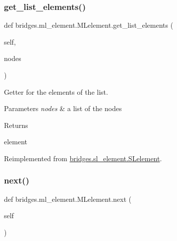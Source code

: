 \mbox{\label{classbridges_1_1ml__element_1_1_m_lelement_a3996cd2cec7c3978437392eba2ef66eb}} 
\subsubsection{\texorpdfstring{get\_list\_elements()}{get\_list\_elements()}}
{\footnotesize\ttfamily def bridges.\+ml\+\_\+element.\+M\+Lelement.\+get\+\_\+list\+\_\+elements (\begin{DoxyParamCaption}\item[{}]{self,  }\item[{}]{nodes }\end{DoxyParamCaption})}



Getter for the elements of the list. 


\begin{DoxyParams}{Parameters}
{\em nodes} & a list of the nodes \\
\hline
\end{DoxyParams}
\begin{DoxyReturn}{Returns}


element 
\end{DoxyReturn}


Reimplemented from \mbox{\hyperlink{classbridges_1_1sl__element_1_1_s_lelement_ad3b94c8e7540aca841e6306c190e1be1}{bridges.\+sl\+\_\+element.\+S\+Lelement}}.

\mbox{\label{classbridges_1_1ml__element_1_1_m_lelement_a951d30261514e6eaefdd7d60f1c77f73}} 
\subsubsection{\texorpdfstring{next()}{next()}\hspace{0.1cm}{\footnotesize\ttfamily [1/2]}}
{\footnotesize\ttfamily def bridges.\+ml\+\_\+element.\+M\+Lelement.\+next (\begin{DoxyParamCaption}\item[{}]{self }\end{DoxyParamCaption})}



